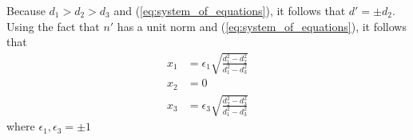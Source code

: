 \documentclass{article}
\begin{document}
%
Because $d_1 > d_2 > d_3$ and (\ref {eq:system_of_equations}), it follows that $d' = \pm d_2$.
%
Using the fact that $n'$ has a unit norm and (\ref {eq:system_of_equations}), it follows that
%
\begin {equation}
\begin {aligned}
x_1 &= \epsilon_1 \sqrt {\frac {d_1^2 - d_2^2}{d_1^2 - d_3^2}} \\
x_2 &= 0 \\
x_3 &= \epsilon_3 \sqrt {\frac {d_2^2 - d_3^2}{d_1^2 - d_3^2}}
\end {aligned}
\end {equation}
%
where $\epsilon_1, \epsilon_3 = \pm 1$
\end{document}
